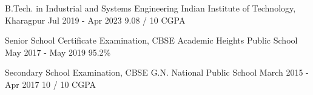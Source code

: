 

\begin{cventries}

  \cventry
    {B.Tech. in Industrial and Systems Engineering} %
    {Indian Institute of Technology, Kharagpur} %
    {Jul 2019 - Apr 2023} %
    {9.08 / 10 CGPA} %
    {}

  \cventry
    {Senior School Certificate Examination, CBSE} %
    {Academic Heights Public School} %
    {May 2017 - May 2019} %
    {95.2\%} %
    {}
    
  \cventry
    {Secondary School Examination, CBSE} %
    {G.N. National Public School} %
    {March 2015 - Apr 2017} %
    {10 / 10 CGPA} %
    {}

\end{cventries}
